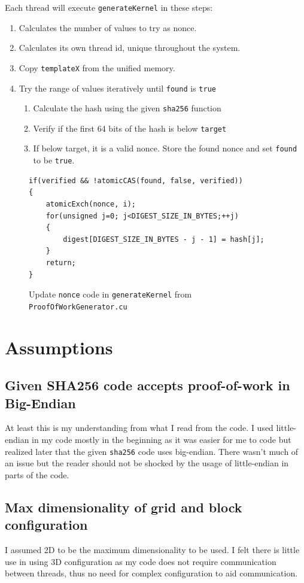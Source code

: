 \documentclass[a4paper]{article}
\begin{document}
Each thread will execute \texttt{generateKernel} in these steps:
\begin{enumerate}
    \item Calculates the number of values to try as nonce.
    \item Calculates its own thread id, unique throughout the system.
    \item Copy \texttt{templateX} from the unified memory.
    \item Try the range of values iteratively until \texttt{found} is \texttt{true}
        \begin{enumerate}
            \item Calculate the hash using the given \texttt{sha256} function
            \item Verify if the first 64 bits of the hash is below \texttt{target}
            \item If below target, it is a valid nonce. Store the found nonce and set \texttt{found} to be \texttt{true}.
        \end{enumerate}
\end{enumerate}

\begin{figure}
\begin{lstlisting}
if(verified && !atomicCAS(found, false, verified))
{
    atomicExch(nonce, i);
    for(unsigned j=0; j<DIGEST_SIZE_IN_BYTES;++j)
    {
        digest[DIGEST_SIZE_IN_BYTES - j - 1] = hash[j];
    }
    return;
}
\end{lstlisting}
\caption{\label{fig:update-nonce} Update \texttt{nonce} code in \texttt{generateKernel} from \texttt{ProofOfWorkGenerator.cu}}
\end{figure}

\section{Assumptions}
\subsection{Given SHA256 code accepts proof-of-work in Big-Endian}
At least this is my understanding from what I read from the code. I used little-endian in my code mostly in the beginning as it was easier for me to code but realized later that the given \texttt{sha256} code uses big-endian. There wasn't much of an issue but the reader should not be shocked by the usage of little-endian in parts of the code.

\subsection{Max dimensionality of grid and block configuration}
I assumed 2D to be the maximum dimensionality to be used. I felt there is little use in using 3D configuration as my code does not require communication between threads, thus no need for complex configuration to aid communication.
\end{document}
